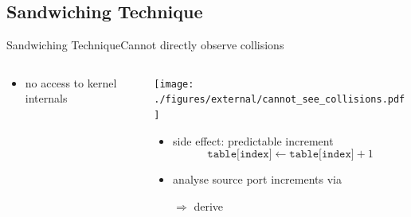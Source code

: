 \documentclass[aspectratio=169, hyperref={colorlinks=true, allcolors=SecondaryColor}, c]{beamer}
\begin{document}
	\subsection{Sandwiching Technique}

	\begin{frame}[fragile]{Sandwiching Technique}{Cannot directly observe collisions}
		\begin{columns}
			\begin{column}[t]{0.4\textwidth}
				\vspace{0cm}

				\begin{itemize}
					\item no access to \alert{kernel internals} %
				\end{itemize}
				\vspace{0.3cm}

			\end{column}
			\begin{column}[t]{0.6\textwidth}
				\vspace{0cm}

				\texttt{[image: ./figures/external/cannot\_see\_collisions.pdf]} %
				\begin{itemize}
					\item \alert{side effect}: predictable increment
					\[
						\texttt{table[index]} \leftarrow \texttt{table[index]} + 1
					\]
					\item analyse source port increments via 
					\item[\alert{$\Rightarrow$}] derive 
				\end{itemize}

			\end{column}
		\end{columns}
	\end{frame}
\end{document}
